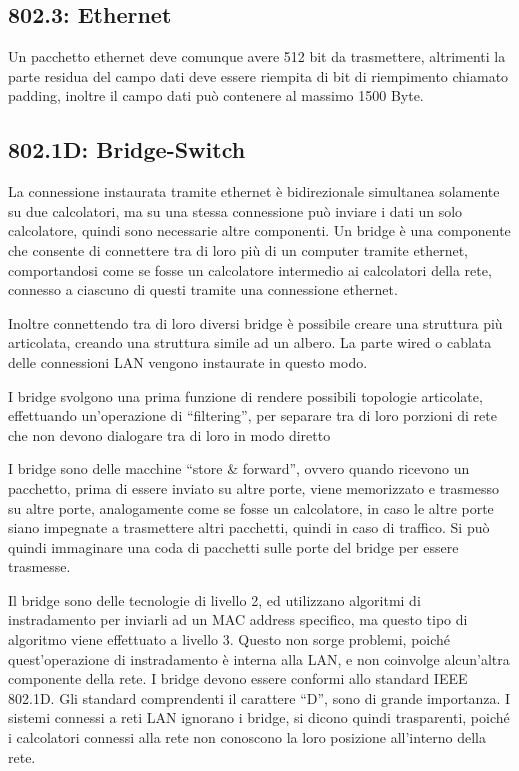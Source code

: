 \documentclass{article}
\numberwithin{equation}{subsection}
\begin{document}

\subsection{802.3: Ethernet}


Un pacchetto ethernet deve comunque avere 512 bit da trasmettere, altrimenti la parte residua del campo dati deve essere riempita di bit 
di riempimento chiamato padding, inoltre il campo dati può contenere al massimo 1500 Byte. 

\subsection{802.1D: Bridge-Switch}

La connessione instaurata tramite ethernet è bidirezionale simultanea solamente su due calcolatori, ma su una stessa connessione può inviare i dati un solo 
calcolatore, quindi sono necessarie altre componenti. Un bridge è una componente che consente di connettere tra di loro più di un computer 
tramite ethernet, comportandosi come se fosse un calcolatore intermedio ai calcolatori della rete, connesso a ciascuno di questi tramite una connessione 
ethernet. 

Inoltre connettendo tra di loro diversi bridge è possibile creare una struttura più articolata, creando una struttura simile ad un albero. La 
parte wired o cablata delle connessioni LAN vengono instaurate in questo modo. 



I bridge svolgono una prima funzione di rendere possibili topologie articolate, effettuando un'operazione di ``filtering'', per separare tra di loro porzioni di rete che 
non devono dialogare tra di loro in modo diretto


I bridge sono delle macchine ``store \& forward'', ovvero quando ricevono un pacchetto, prima di essere inviato su altre porte, viene 
memorizzato e trasmesso su altre porte, analogamente come se fosse un calcolatore, in caso le altre porte siano impegnate a trasmettere altri 
pacchetti, quindi in caso di traffico. Si può quindi immaginare una coda di pacchetti sulle porte del bridge per essere trasmesse. 

Il bridge sono delle tecnologie di livello 2, ed utilizzano algoritmi di instradamento per inviarli ad un MAC address specifico, ma questo tipo di 
algoritmo viene effettuato a livello 3. Questo non sorge problemi, poiché quest'operazione di instradamento è interna alla LAN, e non coinvolge alcun'altra componente 
della rete. I bridge devono essere conformi allo standard IEEE 802.1D. Gli standard comprendenti il carattere ``D'', sono di grande importanza. 
I sistemi connessi a reti LAN ignorano i bridge, si dicono quindi trasparenti, poiché i calcolatori connessi alla rete non conoscono la loro posizione all'interno della 
rete. 
\end{document}
